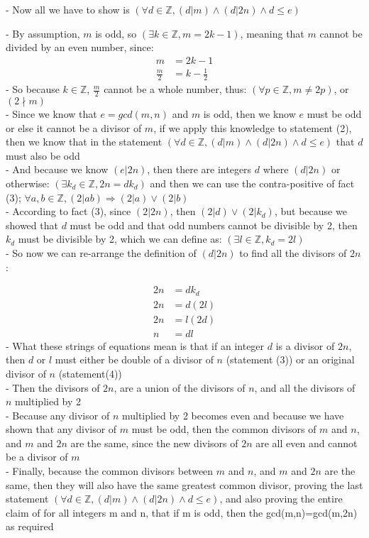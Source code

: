 \documentclass[20pt]{article}
\begin{document}
\begin{enumerate}
- Now all we have to show is \textbf{$(\forall d\in\mathbb{Z},(d|m)\land(d|2n)\land d\leq e)$}

-  By assumption, $m$ is odd, so $(\exists k \in\mathbb{Z}, m = 2k-1)$, meaning that $m$ cannot be divided by an even number, since:
\begin{align}
    m &= 2k-1 \nonumber\\
    \frac{m}{2} &= k-\frac{1}{2} \nonumber
\end{align}
- So because $k\in\mathbb{Z}$, $\frac{m}{2}$ cannot be a whole number, thus: $(\forall p \in\mathbb{Z}, m \neq 2p)$, or $(2\nmid m)$\\
- Since we know that $e = gcd(m,n)$ and $m$ is odd, then we know $e$ must be odd or else it cannot be a divisor of $m$, if we apply this knowledge to statement (2), then we know that in the statement $(\forall d\in\mathbb{Z},(d|m)\land(d|2n)\land d\leq e)$ that $d$ must also be odd\\
- And because we know $(e|2n)$, then there are integers $d$  where $(d|2n)$ or otherwise: $(\exists k_d \in\mathbb{Z}, 2n=dk_d)$ and then we can use the contra-positive of fact (3); $\forall a,b\in\mathbb{Z},(2|ab)\Rightarrow(2|a)\lor(2|b)$\\
- According to fact (3), since $(2|2n)$, then $(2|d) \lor (2|k_d)$, but because we showed that $d$ must be odd and that odd numbers cannot be divisible by 2, then $k_d$ must be divisible by 2, which we can define as: $(\exists l \in\mathbb{Z}, k_d=2l)$\\
- So now we can re-arrange the definition of $(d|2n)$ to find all the divisors of $2n$:

\begin{align}
    2n &= dk_d \nonumber \\
    2n &= d(2l) \tag{3} \\
    2n &= l(2d) \nonumber \\
    n &= dl \tag{4}
\end{align}
- What these strings of equations mean is that if an integer $d$ is a divisor of $2n$, then $d$ or $l$ must either be double of a divisor of $n$ (statement (3)) or an original divisor of $n$ (statement(4))\\
- Then the divisors of $2n$, are a union of the divisors of $n$, and all the divisors of $n$ multiplied by 2\\
- Because any divisor of $n$ multiplied by 2 becomes even and because we have shown that any divisor of $m$ must be odd, then the common divisors of $m$ and $n$, and $m$ and $2n$ are the same, since the new divisors of $2n$ are all even and cannot be a divisor of $m$\\
- Finally, because the common divisors between $m$ and $n$, and $m$ and $2n$ are the same, then they will also have the same greatest common divisor, proving the last statement  $(\forall d\in\mathbb{Z},(d|m)\land(d|2n)\land d\leq e)$, and also proving the entire claim of for all integers m and n, that if m is odd, then the gcd(m,n)=gcd(m,2n)
as required \hfill \Box


\end{enumerate}
\end{document}
